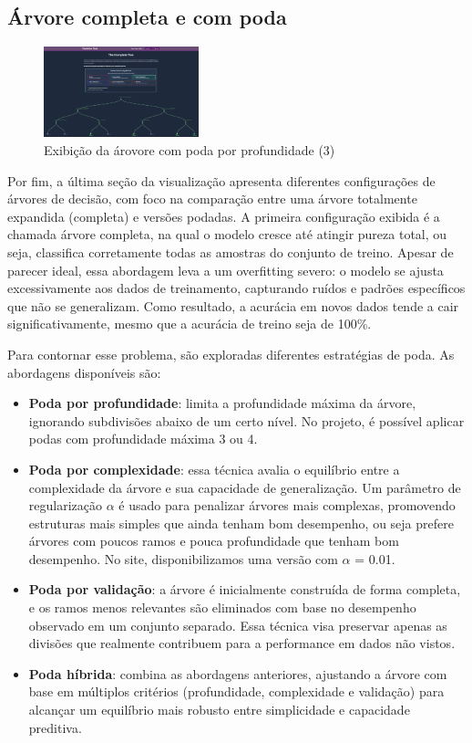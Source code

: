 \documentclass[conference]{IEEEtran}
\begin{document}
\subsection{Árvore completa e com poda}

\begin{figure}[h]
    \centering
    \includegraphics[width=0.4\textwidth]{treePrun.png}
    \caption{Exibição da árovore com poda por profundidade (3)}
    \label{fig:minha_imagem}
\end{figure}

Por fim, a última seção da visualização apresenta diferentes configurações de árvores de decisão, com foco na comparação entre uma árvore totalmente expandida (completa) e versões podadas. A primeira configuração exibida é a chamada árvore completa, na qual o modelo cresce até atingir pureza total, ou seja, classifica corretamente todas as amostras do conjunto de treino. Apesar de parecer ideal, essa abordagem leva a um overfitting severo: o modelo se ajusta excessivamente aos dados de treinamento, capturando ruídos e padrões específicos que não se generalizam. Como resultado, a acurácia em novos dados tende a cair significativamente, mesmo que a acurácia de treino seja de 100\%.

Para contornar esse problema, são exploradas diferentes estratégias de poda. As abordagens disponíveis são:
\begin{itemize}
    \item \textbf{Poda por profundidade}: limita a profundidade máxima da árvore, ignorando subdivisões abaixo de um certo nível. No projeto, é possível aplicar podas com profundidade máxima 3 ou 4.

\item \textbf{Poda por complexidade}: essa técnica avalia o equilíbrio entre a complexidade da árvore e sua capacidade de generalização. Um parâmetro de regularização $\alpha$ é usado para penalizar árvores mais complexas, promovendo estruturas mais simples que ainda tenham bom desempenho, ou seja prefere árvores com poucos ramos e pouca profundidade que tenham bom desempenho. No site, disponibilizamos uma versão com $\alpha$ = 0.01.

\item \textbf{Poda por validação}: a árvore é inicialmente construída de forma completa, e os ramos menos relevantes são eliminados com base no desempenho observado em um conjunto separado. Essa técnica visa preservar apenas as divisões que realmente contribuem para a performance em dados não vistos.

\item \textbf{Poda híbrida}: combina as abordagens anteriores, ajustando a árvore com base em múltiplos critérios (profundidade, complexidade e validação) para alcançar um equilíbrio mais robusto entre simplicidade e capacidade preditiva.
\end{itemize}
\end{document}
